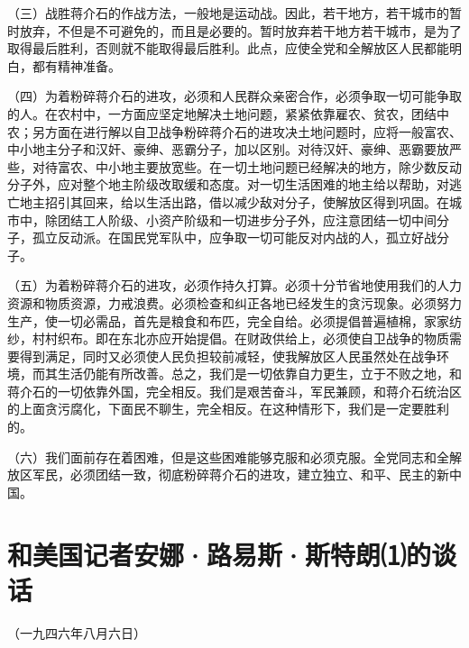 \documentclass[UTF-8, a5paper, 12pt]{ctexart}
\begin{document}
（三）战胜蒋介石的作战方法，一般地是运动战。因此，若干地方，若干城市的暂时放弃，不但是不可避免的，而且是必要的。暂时放弃若干地方若干城市，是为了取得最后胜利，否则就不能取得最后胜利。此点，应使全党和全解放区人民都能明白，都有精神准备。

（四）为着粉碎蒋介石的进攻，必须和人民群众亲密合作，必须争取一切可能争取的人。在农村中，一方面应坚定地解决土地问题，紧紧依靠雇农、贫农，团结中农；另方面在进行解以自卫战争粉碎蒋介石的进攻决土地问题时，应将一般富农、中小地主分子和汉奸、豪绅、恶霸分子，加以区别。对待汉奸、豪绅、恶霸要放严些，对待富农、中小地主要放宽些。在一切土地问题已经解决的地方，除少数反动分子外，应对整个地主阶级改取缓和态度。对一切生活困难的地主给以帮助，对逃亡地主招引其回来，给以生活出路，借以减少敌对分子，使解放区得到巩固。在城市中，除团结工人阶级、小资产阶级和一切进步分子外，应注意团结一切中间分子，孤立反动派。在国民党军队中，应争取一切可能反对内战的人，孤立好战分子。

（五）为着粉碎蒋介石的进攻，必须作持久打算。必须十分节省地使用我们的人力资源和物质资源，力戒浪费。必须检查和纠正各地已经发生的贪污现象。必须努力生产，使一切必需品，首先是粮食和布匹，完全自给。必须提倡普遍植棉，家家纺纱，村村织布。即在东北亦应开始提倡。在财政供给上，必须使自卫战争的物质需要得到满足，同时又必须使人民负担较前减轻，使我解放区人民虽然处在战争环境，而其生活仍能有所改善。总之，我们是一切依靠自力更生，立于不败之地，和蒋介石的一切依靠外国，完全相反。我们是艰苦奋斗，军民兼顾，和蒋介石统治区的上面贪污腐化，下面民不聊生，完全相反。在这种情形下，我们是一定要胜利的。

（六）我们面前存在着困难，但是这些困难能够克服和必须克服。全党同志和全解放区军民，必须团结一致，彻底粉碎蒋介石的进攻，建立独立、和平、民主的新中国。


\section{和美国记者安娜·路易斯·斯特朗⑴的谈话}


（一九四六年八月六日）
\end{document}
